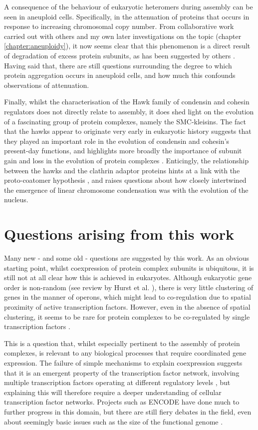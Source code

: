 \documentclass[a4paper,11pt,twoside,openright]{scrbook}
\begin{document}
A consequence of the behaviour of eukaryotic heteromers during assembly can be seen in aneuploid cells. Specifically, in the attenuation of proteins that occurs in response to increasing chromosomal copy number. From collaborative work carried out with others \cite{McShane2016} and my own later investigations on the topic (chapter \ref{chapter:aneuploidy}), it now seems clear that this phenomenon is a direct result of degradation of excess protein subunits, as has been suggested by others \cite{Dephoure2014,Mueller2015,Goncalves2017}. Having said that, there are still questions surrounding the degree to which protein aggregation occurs in aneuploid cells, and how much this confounds observations of attenuation.

Finally, whilst the characterisation of the Hawk family of condensin and cohesin regulators does not directly relate to assembly, it does shed light on the evolution of a fascinating group of protein complexes, namely the SMC-kleisins. The fact that the hawks appear to originate very early in eukaryotic history suggests that they played an important role in the evolution of condensin and cohesin's present-day functions, and highlights more broadly the importance of subunit gain and loss in the evolution of protein complexes \cite{Seidl2009,Wan2015}. Enticingly, the relationship between the hawks and the clathrin adaptor proteins hints at a link with the proto-coatomer hypothesis \cite{Devos2006,Field2011}, and raises questions about how closely intertwined the emergence of linear chromosome condensation was with the evolution of the nucleus.

\section{Questions arising from this work}
Many new - and some old - questions are suggested by this work. As an obvious starting point, whilst coexpression of protein complex subunits is ubiquitous, it is still not at all clear how this is achieved in eukaryotes. Although eukaryotic gene order is non-random (see review by Hurst et al. \cite{Hurst2004}), there is very little clustering of genes in the manner of operons, which might lead to co-regulation due to spatial proximity of active transcription factors. However, even in the absence of spatial clustering, it seems to be rare for protein complexes to be co-regulated by single transcription factors \cite{Tan2007}.

This is a question that, whilst especially pertinent to the assembly of protein complexes, is relevant to any biological processes that require coordinated gene expression. The failure of simple mechanisms to explain coexpression suggests that it is an emergent property of the transcription factor network, involving multiple transcription factors operating at different regulatory levels \cite{Tsai2007,Muhammad2017}, but explaining this will therefore require a deeper understanding of cellular transcription factor networks. Projects such as ENCODE have done much to further progress in this domain, but there are still fiery debates in the field, even about seemingly basic issues such as the size of the functional genome \cite{Neph2012,Graur2013,Graur2017}.
\end{document}
